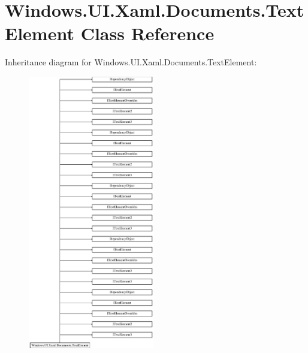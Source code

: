 \hypertarget{class_windows_1_1_u_i_1_1_xaml_1_1_documents_1_1_text_element}{}\section{Windows.\+U\+I.\+Xaml.\+Documents.\+Text\+Element Class Reference}
\label{class_windows_1_1_u_i_1_1_xaml_1_1_documents_1_1_text_element}
Inheritance diagram for Windows.\+U\+I.\+Xaml.\+Documents.\+Text\+Element\+:\begin{figure}[H]
\begin{center}
\leavevmode
\includegraphics[height=12.000000cm]{class_windows_1_1_u_i_1_1_xaml_1_1_documents_1_1_text_element}
\end{center}
\end{figure}
